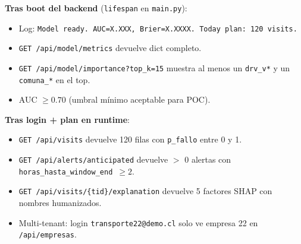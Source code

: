 \documentclass[11pt,a4paper]{article}
\begin{document}
\textbf{Tras boot del backend} (\texttt{lifespan} en \texttt{main.py}):
\begin{itemize}[leftmargin=2em]
  \item[$\square$] Log: \texttt{Model ready. AUC=X.XXX, Brier=X.XXXX. Today plan: 120 visits.}
  \item[$\square$] \texttt{GET /api/model/metrics} devuelve dict completo.
  \item[$\square$] \texttt{GET /api/model/importance?top\_k=15} muestra al menos un \texttt{drv\_v*} y un \texttt{comuna\_*} en el top.
  \item[$\square$] AUC $\geq 0.70$ (umbral mínimo aceptable para POC).
\end{itemize}

\textbf{Tras login + plan en runtime}:
\begin{itemize}[leftmargin=2em]
  \item[$\square$] \texttt{GET /api/visits} devuelve 120 filas con \texttt{p\_fallo} entre 0 y 1.
  \item[$\square$] \texttt{GET /api/alerts/anticipated} devuelve $>$ 0 alertas con \texttt{horas\_hasta\_window\_end $\geq 2$}.
  \item[$\square$] \texttt{GET /api/visits/\{tid\}/explanation} devuelve 5 factores SHAP con nombres humanizados.
  \item[$\square$] Multi-tenant: login \texttt{transporte22@demo.cl} solo ve empresa 22 en \texttt{/api/empresas}.
\end{itemize}
\end{document}
